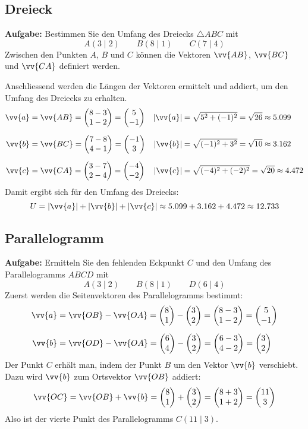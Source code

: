 \subsection{Dreieck}
\textbf{Aufgabe:} Bestimmen Sie den Umfang des Dreiecks $\triangle ABC$ mit
\[
  A(3\mid 2) \qquad B(8\mid 1) \qquad C(7\mid 4)
\]
Zwischen den Punkten $A$, $B$ und $C$ können die Vektoren $\vv{AB}$, $\vv{BC}$ und $\vv{CA}$ definiert werden.
\begin{center}
\end{center}
Anschliessend werden die Längen der Vektoren ermittelt und addiert, um den Umfang des Dreiecks zu erhalten.
\begin{align*}
  \vv{a} &= \vv{AB} = \vxy{8-3}{1-2} = \vxy{5}{-1} & |\vv{a}| &= \sqrt{5^{2}+(-1)^{2}} = \sqrt{26} \approx 5.099 \\[2mm]
  \vv{b} &= \vv{BC} = \vxy{7-8}{4-1} = \vxy{-1}{3} & |\vv{b}| &= \sqrt{(-1)^{2}+3^{2}} = \sqrt{10} \approx 3.162 \\[2mm]
  \vv{c} &= \vv{CA} = \vxy{3-7}{2-4} = \vxy{-4}{-2} & |\vv{c}| &= \sqrt{(-4)^{2}+(-2)^{2}} = \sqrt{20} \approx 4.472
\end{align*}
Damit ergibt sich für den Umfang des Dreiecks:
\[
  U = |\vv{a}|+|\vv{b}|+|\vv{c}| \approx 5.099 + 3.162 + 4.472 \approx 12.733
\]

\subsection{Parallelogramm}

\textbf{Aufgabe:} Ermitteln Sie den fehlenden Eckpunkt $C$ und den Umfang des Parallelogramms $ABCD$ mit
\[
  A(3\mid 2) \qquad B(8\mid 1) \qquad D(6\mid 4)
\]
Zuerst werden die Seitenvektoren des Parallelogramms bestimmt:
\begin{align*}
  \vv{a} &= \vv{OB}-\vv{OA} = \vxy{8}{1}-\vxy{3}{2} = \vxy{8-3}{1-2} = \vxy{5}{-1} \\[2mm]
  \vv{b} &= \vv{OD}-\vv{OA} = \vxy{6}{4}-\vxy{3}{2} = \vxy{6-3}{4-2} = \vxy{3}{2}
\end{align*}
Der Punkt $C$ erhält man, indem der Punkt $B$ um den Vektor $\vv{b}$ verschiebt. Dazu wird $\vv{b}$ zum Ortsvektor $\vv{OB}$ addiert:
\[
  \vv{OC} = \vv{OB} + \vv{b} = \vxy{8}{1} + \vxy{3}{2} = \vxy{8+3}{1+2} = \vxy{11}{3}
\]
Also ist der vierte Punkt des Parallelogramms $C(11\mid 3)$.

